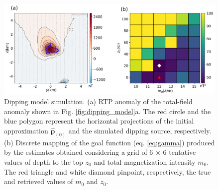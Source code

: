 \begin{figure}
    \centering
    \includegraphics[width=\linewidth]{figures/inclined_rtp.png}
    \caption{Dipping model simulation. (a) RTP anomaly of the total-field anomaly shown in 
	Fig. \ref{fig:dipping_model}a. 
	The red circle and the blue polygon represent the horizontal projections of the 	   initial approximation $\hat{\mathbf{p}}_{(0)}$ and  the simulated dipping source, respectively.
	(b) Discrete mapping of the goal function (eq. \ref{eq:gamma}) produced by the estimates obtained considering a grid of 6 $\times$ 6 tentative values of 
	   depth to the top $z_0$ and total-magnetization intensity $m_0$. 
	   The red triangle  and white diamond pinpoint, respectively, the true and retrieved 	   
	   values of $m_0$  and $z_0$.     
}
    \label{fig:dipping_rtp}
\end{figure}


